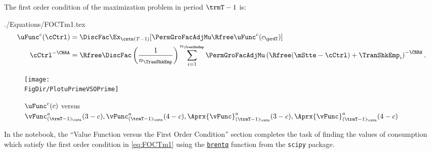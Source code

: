\documentclass[\econtexRoot/SolvingMicroDSOPs]{subfiles}
\begin{document}
The first order condition of the maximization problem in period $\trmT-1$ is:
\begin{verbatimwrite}{./Equations/FOCTm1.tex}
  \begin{equation}\begin{gathered}\begin{aligned}
        \uFunc^{c}(\cCtrl)       & = \DiscFac \Ex_{\cntn(T-1)} [\PermGroFacAdjMu\Rfree \uFunc^{c}(c_{\prdT})]  %
        \\      \cCtrl^{-\CRRA}   & = \Rfree \DiscFac \left(\frac{1}{n_{\TranShkEmp}}\right) \sum_{i=1}^{n_{\TranShkEmp}} \PermGroFacAdjMu\left(\Rfree (\mStte-\cCtrl) + \TranShkEmp_{i}\right)^{-\CRRA} \label{eq:FOCTm1}.
      \end{aligned}\end{gathered}\end{equation}
\end{verbatimwrite}
\unskip
{}
\hypertarget{PlotuPrimeVSOPrime}{}
\begin{figure}
  \centerline{\texttt{[image: \\FigDir/PlotuPrimeVSOPrime]}}
  \caption{$\uFunc^{c}(c)$ versus $\vFunc_{({\trmT-1})_\cntn}^{a}(3-c), \vFunc_{({\trmT-1})_\cntn}^{a}(4-c), \Aprx{\vFunc}_{({\trmT-1})_\cntn}^{a}(3-c), \Aprx{\vFunc}_{({\trmT-1})_\cntn}^{a}(4-c)$}
  \label{fig:PlotuPrimeVSOPrime}
\end{figure}

In the notebook, the ``Value Function versus the First Order Condition'' section completes the task of finding the values of consumption which satisfy the first order condition in \eqref{eq:FOCTm1} using the \href{https://docs.scipy.org/doc/scipy/reference/generated/scipy.optimize.brentq.html}{\texttt{brentq}} function from the \texttt{scipy} package. %
\end{document}
